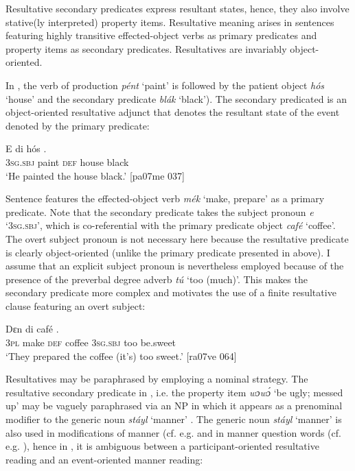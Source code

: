 Resultative secondary predicates express resultant states, hence, they also involve stative(ly interpreted) property items. Resultative meaning arises in sentences featuring highly transitive effected-object verbs\index{} as primary predicates and property items as secondary predicates. Resultatives are invariably object-oriented.


In , the verb of production \textit{pént} ‘paint’ is followed by the patient object \textit{hós} ‘house’ and the secondary predicate \textit{blák} ‘black’). The secondary predicated is an object-oriented resultative adjunct that denotes the resultant state of the event denoted by the primary predicate:



\ea%
    \label{ex:key:1602}
    \gll E      di  hós    .\\
\textsc{3sg.sbj}  paint  \textsc{def}  house  black\\

\glt ‘He painted the house black.’ [pa07me 037]
\z

Sentence  features the effected-object verb\is{} \textit{mék} ‘make, prepare’ as a primary predicate. Note that the secondary predicate takes the subject pronoun \textit{e} ‘\textsc{3sg.sbj}’, which is co-referential with the primary predicate object \textit{café} ‘coffee’. The overt subject pronoun is not necessary here because the resultative predicate is clearly object-oriented (unlike the primary predicate presented in  above). I assume that an explicit subject pronoun is nevertheless employed because of the presence of the preverbal degree adverb \textit{tú} ‘too (much)’. This makes the secondary predicate more complex and motivates the use of a finite resultative clause featuring an overt subject: 


\ea%
    \label{ex:key:1603}
    \gll Dɛn        di  café          .\\
\textsc{3pl}    make  \textsc{def}  coffee  \textsc{3sg.sbj}  too  be.sweet\\

\glt ‘They prepared the coffee (it’s) too sweet.’ [ra07ve 064]
\z

Resultatives may be paraphrased by employing a nominal strategy. The resultative secondary predicate in , i.e. the property item \textit{wɔwɔ́} ‘be ugly; messed up’ may be vaguely paraphrased via an NP in which it appears as a prenominal modifier to the generic noun \textit{stáyl} ‘manner’ . The generic noun \textit{stáyl} ‘manner’ is also used in modifications of manner (cf. e.g.  and in manner question words (cf. e.g. ), hence in , it is ambiguous between a participant-oriented resultative reading and an event-oriented manner reading:


